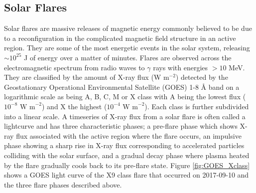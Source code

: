 \subsection{Solar Flares}
\label{subsec:sf}
Solar flares are massive releases of magnetic energy commonly believed to be due to a reconfiguration in the complicated magnetic field structure in an active region.  They are some of the most energetic events in the solar system, releasing $\sim 10^{25}$ J of energy over a matter of minutes. Flares are observed across the electromagnetic spectrum from radio waves to $\gamma$ rays with energies $> 10$ MeV. They are classified by the amount of X-ray flux (W m$^{-2}$) detected by the Geostationary Operational Environmental Satellite (GOES) 1-8 {\AA} band on a logarithmic scale as being A, B, C, M or X class with A being the lowest flux ($10^{-8} \mbox{ W m}^{-2}$) and X the highest ($10^{-4} \mbox{ W m}^{-2}$). Each class is further subdivided into a linear scale.
A timeseries of X-ray flux from a solar flare is often called a lightcurve and has three characteristic phases; a pre-flare phase which shows X-ray flux associated with the active region where the flare occurs, an impulsive phase showing a sharp rise in X-ray flux corresponding to accelerated particles colliding with the solar surface, and a gradual decay phase where plasma heated by the flare gradually cools back to its pre-flare state. Figure \ref{fig:GOES_Xclass} shows a GOES light curve of the X9 class flare that occurred on 2017-09-10 and the three flare phases described above.


